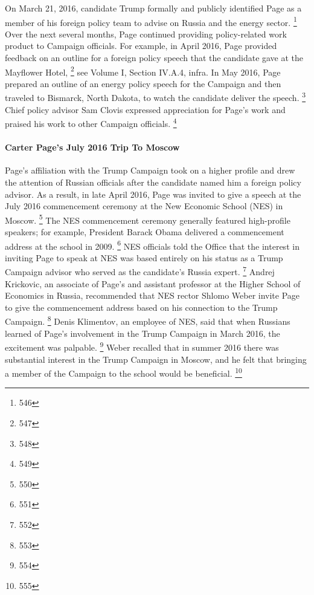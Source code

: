 On March 21, 2016, candidate Trump formally and publicly identified Page as a member of his foreign policy team to advise on Russia and the energy sector.%
\footnote{546}
Over the next several months, Page continued providing policy-related work product to Campaign officials.
For example, in April 2016, Page provided feedback on an outline for a foreign policy speech that the candidate gave at the Mayflower Hotel,%
\footnote{547}
see Volume I, Section IV.A.4, infra.
In May 2016, Page prepared an outline of an energy policy speech for the Campaign and then traveled to Bismarck, North Dakota, to watch the candidate deliver the speech.%
\footnote{548}
Chief policy advisor Sam Clovis expressed appreciation for Page's work and praised his work to other Campaign officials.%
\footnote{549}

\paragraph{Carter Page's July 2016 Trip To Moscow}

Page's affiliation with the Trump Campaign took on a higher profile and drew the attention of Russian officials after the candidate named him a foreign policy advisor.
As a result, in late April 2016, Page was invited to give a speech at the July 2016 commencement ceremony at the New Economic School (NES) in Moscow.%
\footnote{550}
The NES commencement ceremony generally featured high-profile speakers; for example, President Barack Obama delivered a commencement address at the school in 2009.%
\footnote{551}
NES officials told the Office that the interest in inviting Page to speak at NES was based entirely on his status as a Trump Campaign advisor who served as the candidate's Russia expert.%
\footnote{552}
Andrej Krickovic, an associate of Page's and assistant professor at the Higher School of Economics in Russia, recommended that NES rector Shlomo Weber invite Page to give the commencement address based on his connection to the Trump Campaign.%
\footnote{553}
Denis Klimentov, an employee of NES, said that when Russians learned of Page's involvement in the Trump Campaign in March 2016, the excitement was palpable.%
\footnote{554}
Weber recalled that in summer 2016 there was substantial interest in the Trump Campaign in Moscow, and he felt that bringing a member of the Campaign to the school would be beneficial.%
\footnote{555}

